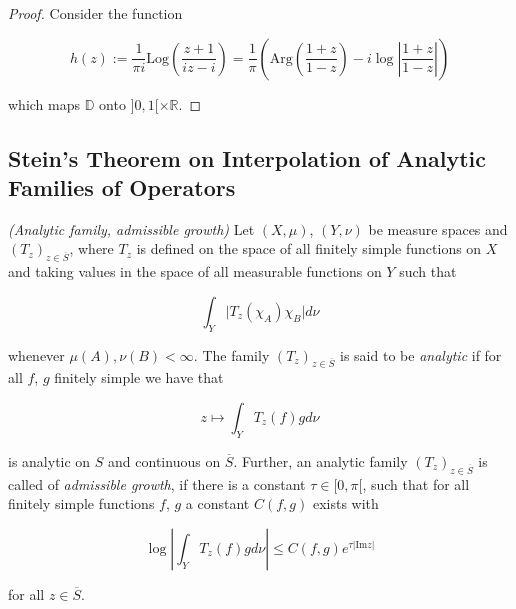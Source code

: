 \begin{proof}
	Consider the function 

	\begin{equation}
		h(z) := \frac{1}{\pi i}\mathrm{Log}\left( \frac{z + 1}{iz - i} \right) = \frac{1}{\pi} \left( \mathrm{Arg} \left( \frac{1 + z}{1 - z} \right)-i\log\left\vert \frac{1 + z}{1 - z} \right\vert\right)
	\end{equation}

which maps $\mathbb{D}$ onto $]0,1[ \times \mathbb{R}$.
\end{proof}

\subsection{Stein's Theorem on Interpolation of Analytic Families of Operators}

\begin{mdframed}
	\begin{definition}\emph{(Analytic family, admissible growth)}
		Let $(X,\mu)$, $(Y,\nu)$ be measure spaces and $\left( T_z \right)_{z \in \overline{S}}$, where $T_z$ is defined on the space of all finitely simple functions on $X$ and taking values in the space of all measurable functions on $Y$ such that

		\begin{equation}
			\int_Y \vert T_z(\chi_A)\chi_B \vert d\nu
		\end{equation}

		whenever $\mu(A),\nu(B) < \infty$. The family $\left( T_z \right)_{z \in \overline{S}}$ is said to be \emph{analytic} if for all $f$, $g$ finitely simple we have that

		\begin{equation}
			z \mapsto \int_Y T_z(f)gd\nu
		\end{equation}

		is analytic on $S$ and continuous on $\overline{S}$. Further, an analytic family $\left( T_z \right)_{z \in \overline{S}}$ is called of \emph{admissible growth}, if there is a constant $\tau \in [0,\pi[$, such that for all finitely simple functions $f$, $g$ a constant $C(f,g)$ exists with

			\begin{equation}
				\log\left\vert \int_Y T_z(f) g d\nu\right\vert \leqslant C(f,g)e^{\tau\vert \mathrm{Im}z\vert}
			\end{equation}

			for all $z \in \overline{S}$.
	\end{definition}
\end{mdframed}

